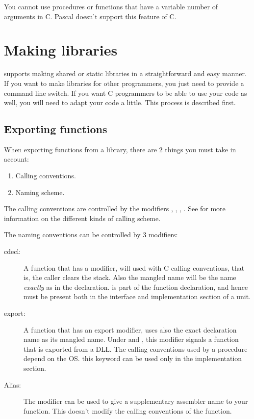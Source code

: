 \documentclass{report}
\begin{document}
You cannot use procedures or functions that have a variable number of
arguments in C. Pascal doesn't support this feature of C.

\section{Making libraries}
\label{se:SharedLib}

\fpc supports making shared or static libraries in a straightforward and 
easy manner.
If you want to make libraries for other \fpc programmers, you just need to
provide a command line switch. If you want C programmers to be able to use
your code as well, you will need to adapt your code a little. This process
is described first.

\subsection{Exporting functions}

When exporting functions from a library, there are 2 things you must take in
account:

\begin{enumerate}
\item Calling conventions.
\item Naming scheme.
\end{enumerate}
The calling conventions are controlled by the modifiers ,
, , . See  for more
information on the different kinds of calling scheme.

The naming conventions can be controlled by 3 modifiers:
\begin{description}
\item [cdecl:\ ] A function that has a  modifier, will used
with C calling conventions, that is, the caller clears the stack. Also
the mangled name will be the name {\em exactly} as in the declaration.
 is part of the function declaration, and hence must be present
both in the interface and implementation section of a unit.

\item [export:\ ] A function that has an export modifier, uses also the
exact declaration name as its mangled name. Under \windowsnt and \ostwo,
this modifier signals a function that is exported from a DLL.
The calling conventions used by a  procedure depend on the OS.
this keyword can be used only in the implementation section.
\item [Alias: ] The  modifier can be used to give a supplementary
assembler name to your function. This doesn't modify the calling conventions
of the function.
\end{description}
\end{document}

